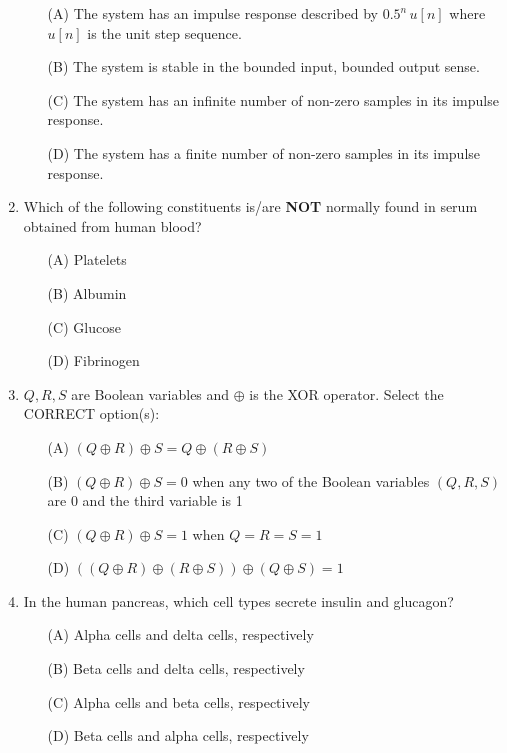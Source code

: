 \documentclass[journal]{IEEEtran}
\begin{document}
\begin{enumerate}
\begin{enumerate}
    \item[(A)] The system has an impulse response described by \( 0.5^n \, u[n] \) where \( u[n] \) is the unit step sequence.
    \item[(B)] The system is stable in the bounded input, bounded output sense.
    \item[(C)] The system has an infinite number of non-zero samples in its impulse response.
    \item[(D)] The system has a finite number of non-zero samples in its impulse response.
\end{enumerate}
\hfill{}

\item  Which of the following constituents is/are \textbf{NOT} normally found in serum obtained from human blood?

\begin{enumerate}
    \item[(A)] Platelets
    \item[(B)] Albumin
    \item[(C)] Glucose
    \item[(D)] Fibrinogen
\end{enumerate}
\hfill{}

\item  \( Q, R, S \) are Boolean variables and \( \oplus \) is the XOR operator. Select the CORRECT option(s):

\begin{enumerate}
    \item[(A)] \( (Q \oplus R) \oplus S = Q \oplus (R \oplus S) \)
    \item[(B)] \( (Q \oplus R) \oplus S = 0 \) when any two of the Boolean variables \( (Q, R, S) \) are 0 and the third variable is 1
    \item[(C)] \( (Q \oplus R) \oplus S = 1 \) when \( Q = R = S = 1 \)
    \item[(D)] \( ((Q \oplus R) \oplus (R \oplus S)) \oplus (Q \oplus S) = 1 \)
\end{enumerate}
\hfill{}

\item  In the human pancreas, which cell types secrete insulin and glucagon?

\begin{enumerate}
    \item[(A)] Alpha cells and delta cells, respectively
    \item[(B)] Beta cells and delta cells, respectively
    \item[(C)] Alpha cells and beta cells, respectively
    \item[(D)] Beta cells and alpha cells, respectively
\end{enumerate}
\hfill{}


\end{enumerate}
\end{document}
